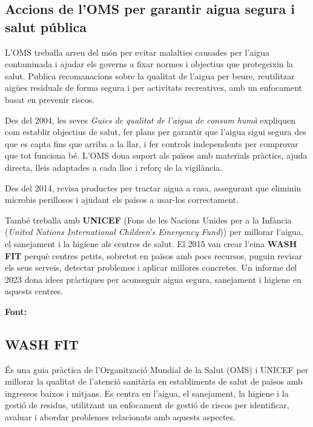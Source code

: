 \subsection{Accions de l’OMS per garantir aigua segura i salut pública}
L’OMS treballa arreu del món per evitar malalties causades per l’aigua contaminada i ajudar els governs a fixar normes i objectius que protegeixin la salut. Publica recomanacions sobre la qualitat de l’aigua per beure, reutilitzar aigües residuals de forma segura i per activitats recreatives, amb un enfocament basat en prevenir riscos.

Des del 2004, les seves \textit{Guies de qualitat de l’aigua de consum humà} expliquen com establir objectius de salut, fer plans per garantir que l’aigua sigui segura des que es capta fins que arriba a la llar, i fer controls independents per comprovar que tot funciona bé. L’OMS dona suport als països amb materials pràctics, ajuda directa, lleis adaptades a cada lloc i reforç de la vigilància.

Des del 2014, revisa productes per tractar aigua a casa, assegurant que eliminin microbis perillosos i ajudant els països a usar-los correctament.

També treballa amb \textbf{UNICEF} (Fons de les Nacions Unides per a la Infància (\textit{United Nations International Children's Emergency Fund})) per millorar l’aigua, el sanejament i la higiene als centres de salut. El 2015 van crear l’eina \textbf{WASH FIT} perquè centres petits, sobretot en països amb pocs recursos, puguin revisar els seus serveis, detectar problemes i aplicar millores concretes. Un informe del 2023 dona idees pràctiques per aconseguir aigua segura, sanejament i higiene en aquests centres.

\textbf{Font:} \cite{OMS2}

\subsection{WASH FIT}
És una guia pràctica de l’Organització Mundial de la Salut (OMS) i UNICEF per millorar la qualitat de l’atenció sanitària en establiments de salut de països amb ingressos baixos i mitjans. Es centra en l’aigua, el sanejament, la higiene i la gestió de residus, utilitzant un enfocament de gestió de riscos per identificar, avaluar i abordar problemes relacionats amb aquests aspectes.

